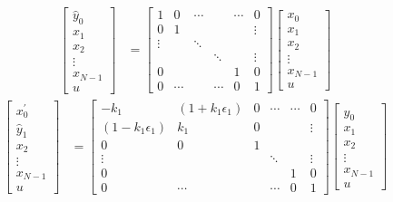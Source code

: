 \documentclass[a4paper,twoside,10pt,english]{article}
\begin{document}
\begin{align*}
\left[\begin{array}{c}
\hat{y}_{0}\\
x_{1}\\
x_{2}\\
\vdots\\
x_{N-1}\\
u \end{array}\right] & = \left[\begin{array}{cccccc}
1 & 0 & \cdots &  & \cdots & 0\\
0 & 1 &  &  &  & \vdots\\
\vdots &  & \ddots\\
 &  &  & \ddots &  & \vdots\\
0 &  &  &  & 1 & 0\\
0 & \cdots &  & \cdots & 0 & 1
\end{array}\right]\left[\begin{array}{c}
x_{0}\\
x_{1}\\
x_{2}\\
\vdots\\
x_{N-1}\\
u
\end{array}\right]
\end{align*}
\begin{align*}
\left[\begin{array}{c}
x_{0}^{\prime}\\
\hat{y}_{1}\\
x_{2}\\
\vdots\\
x_{N-1}\\
u
\end{array}\right] & = \left[\begin{array}{cccccc}
-k_{1} & \left(1+k_{1}\epsilon_{1}\right) & 0 & \cdots & \cdots & 0\\
\left(1-k_{1}\epsilon_{1}\right) & k_{1} & 0 &  &  & \vdots\\
0 & 0 & 1\\
\vdots &  &  & \ddots &  & \vdots\\
0 &  &  &  & 1 & 0\\
0 & \cdots &  & \cdots & 0 & 1
\end{array}\right]\left[\begin{array}{c}
\hat{y}_{0}\\
x_{1}\\
x_{2}\\
\vdots\\
x_{N-1}\\
u
\end{array}\right]
\end{align*}
\end{document}
